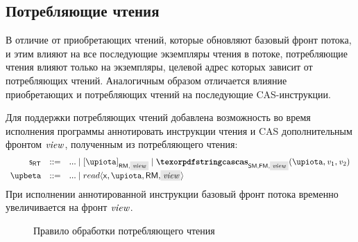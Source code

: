 \subsection{Потребляющие чтения}
В отличие от приобретающих чтений, которые обновляют базовый фронт потока,
и этим влияют на все последующие экземпляры чтения в потоке,
потребляющие чтения влияют только на экземпляры,
целевой адрес которых зависит от потребляющих чтений.
Аналогичным образом отличается влияние приобретающих и потребляющих чтений
на последующие CAS-инструкции.

Для поддержки потребляющих чтений добавлена возможность
во время исполнения программы аннотировать инструкции чтения и
CAS дополнительным фронтом $\stSigma$, полученным из потребляющего чтения:
%
\[\begin{array}{rcl}
\RT & ::= & ... \mid [\locVar]_{\RM,\text{\colorbox{gray!20}{\ensuremath{\stSigma}}}} \mid %
             \CasF{\SM}{\FM}{\locVar}{\mvalSubst_{1}}{\mvalSubst_{2}}{\text{\colorbox{gray!20}{\ensuremath{\stSigma}}}}
\\
\stPostOp & ::= & ... \mid read\angled{\vName, \locVar, \RM, \graybox{\stSigma}}
\end{array}\]
%
При исполнении аннотированной инструкции базовый фронт потока временно
увеличивается на фронт $\stSigma$.

\begin{figure}

\begin{mathpar}
\end{mathpar}
\caption{Правило обработки потребляющего чтения}
\label{fig:readcon}
\end{figure}

